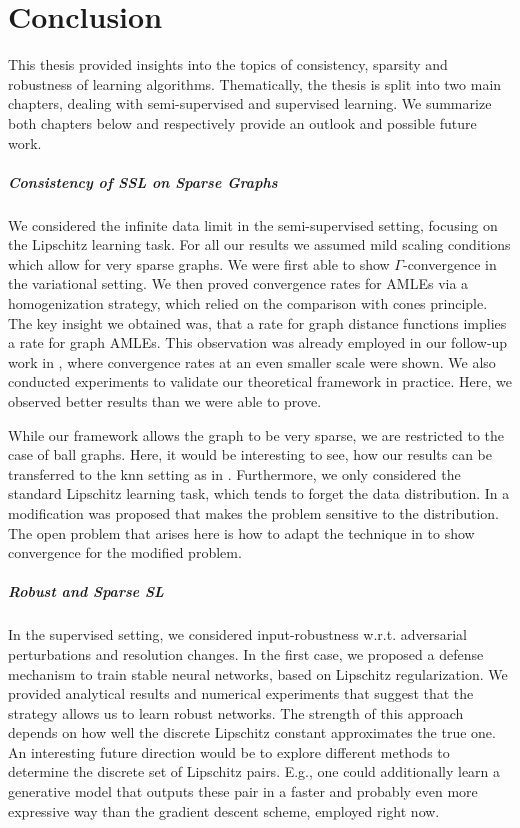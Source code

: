 \chapter{Conclusion}\label{ch:C}
%
%
This thesis provided insights into the topics of consistency, sparsity and robustness of learning algorithms. Thematically, the thesis is split into two main chapters, dealing with semi-supervised and supervised learning. We summarize both chapters below and respectively provide an outlook and possible future work.

\paragraph{Consistency of SSL on Sparse Graphs} We considered the infinite data limit in the semi-supervised setting, focusing on the Lipschitz learning task. For all our results we assumed mild scaling conditions which allow for very sparse graphs. We were first able to show $\Gamma$-convergence in the variational setting. We then proved convergence rates for AMLEs via a homogenization strategy, which relied on the comparison with cones principle. The key insight we obtained was, that a rate for graph distance functions implies a rate for graph AMLEs. This observation was already employed in our follow-up work in \cite{bungert2022ratio}, where convergence rates at an even smaller scale were shown. We also conducted experiments to validate our theoretical framework in practice. Here, we observed better results than we were able to prove. 

While our framework allows the graph to be very sparse, we are restricted to the case of ball graphs. Here, it would be interesting to see, how our results can be transferred to the knn setting as in \cite{calder2022improved}. Furthermore, we only considered the standard Lipschitz learning task, which tends to forget the data distribution. In \cite{calder2019consistency} a modification was proposed that makes the problem sensitive to the distribution. The open problem that arises here is how to adapt the technique in \cite{bungert2021uniform} to show convergence for the modified problem.\par

\paragraph{Robust and Sparse SL} In the supervised setting, we considered input-robustness w.r.t. adversarial perturbations and resolution changes. In the first case, we proposed a defense mechanism to train stable neural networks, based on Lipschitz regularization. We provided analytical results and numerical experiments that suggest that the strategy allows us to learn robust networks. The strength of this approach depends on how well the discrete Lipschitz constant approximates the true one. An interesting future direction would be to explore different methods to determine the discrete set of Lipschitz pairs. E.g., one could additionally learn a generative model that outputs these pair in a faster and probably even more expressive way than the gradient descent scheme, employed right now.

